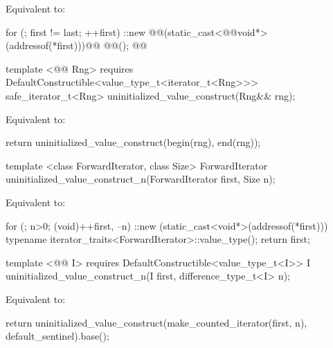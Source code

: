\setcounter{Paras}{0}
\pnum
\effects Equivalent to:

\begin{codeblock}
    for (; first != last; ++first)
      ::new @@(static_cast<@@void*>(addressof(*first)))@\added{)}@
        @@();
    @@
\end{codeblock}

{\color{addclr}
\begin{codeblock}
template <@@ Rng>
requires
  DefaultConstructible<value_type_t<iterator_t<Rng>>>
safe_iterator_t<Rng> uninitialized_value_construct(Rng&& rng);
\end{codeblock}

\pnum
\effects Equivalent to:
\begin{codeblock}
    return uninitialized_value_construct(begin(rng), end(rng));
\end{codeblock}
} %

{\color{remclr}
\begin{codeblock}
template <class ForwardIterator, class Size>
  ForwardIterator uninitialized_value_construct_n(ForwardIterator first, Size n);
\end{codeblock}
\setcounter{Paras}{1}
\pnum
\effects Equivalent to:
\begin{codeblock}
        for (; n>0; (void)++first, --n)
          ::new (static_cast<void*>(addressof(*first)))
            typename iterator_traits<ForwardIterator>::value_type();
        return first;
\end{codeblock}
} %

{\color{addclr}
\begin{codeblock}
template <@@ I>
  requires
DefaultConstructible<value_type_t<I>>
  I uninitialized_value_construct_n(I first, difference_type_t<I> n);
\end{codeblock}

\pnum
\effects Equivalent to:
\begin{codeblock}
    return uninitialized_value_construct(make_counted_iterator(first, n),
                                         default_sentinel{}).base();
\end{codeblock}
} %

